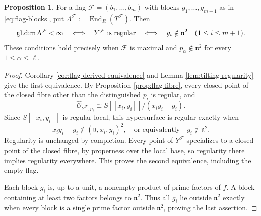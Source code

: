 \documentclass[a4paper,reqno]{amsart}
\def\F{\mathcal{F}}
\def\O{\mathcal{O}}
\def\n{\mathfrak{n}}
\DeclareMathOperator{\End}{End}
\def\gl{\mathop{\rm gl.dim}\nolimits}
\theoremstyle{definition}
\newtheorem{Prop}[Thm]{Proposition}
\begin{document}
\begin{Prop}\label{prop:flag-global-dimension}
For a flag $\F=(b_1,\ldots,b_m)$ with blocks $g_1,\ldots,g_{m+1}$ as in \eqref{eq:flag-blocks}, put $\Lambda^\F:=\End_R(T^\F)$. Then
\begin{equation}\label{eq:flag-global-dimension}
\gl\Lambda^\F<\infty
\quad\Longleftrightarrow\quad Y^\F\text{ is regular}
\quad\Longleftrightarrow\quad
g_i\notin\n^2\quad(1\le i\le m+1).
\end{equation}
These conditions hold precisely when $\F$ is maximal and $p_\alpha\notin\n^2$ for every $1\le\alpha\le\ell$.
\end{Prop}
\begin{proof}
Corollary \ref{cor:flag-derived-equivalence} and Lemma \ref{lem:tilting-regularity} give the first equivalence. By Proposition \ref{prop:flag-fibre}, every closed point of the closed fibre other than the distinguished $p_i$ is regular, and
\[
\widehat{\O}_{Y^\F,p_i}\cong S[[x_i,y_i]]/(x_iy_i-g_i).
\]
Since $S[[x_i,y_i]]$ is regular local, this hypersurface is regular exactly when
\[
x_iy_i-g_i\notin(\n,x_i,y_i)^2,
\quad\text{or equivalently}\quad g_i\notin\n^2.
\]
Regularity is unchanged by completion. Every point of $Y^\F$ specializes to a closed point of the closed fibre, by properness over the local base, so regularity there implies regularity everywhere. This proves the second equivalence, including the empty flag.

Each block $g_i$ is, up to a unit, a nonempty product of prime factors of $f$. A block containing at least two factors belongs to $\n^2$. Thus all $g_i$ lie outside $\n^2$ exactly when every block is a single prime factor outside $\n^2$, proving the last assertion.
\end{proof}
\end{document}

